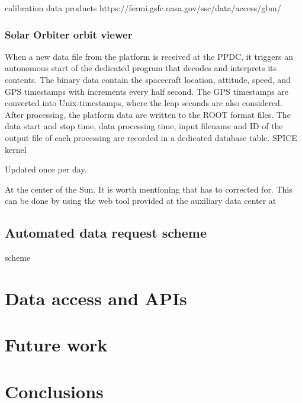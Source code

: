 \documentclass{aa}
\begin{document}
calibration data products
https://fermi.gsfc.nasa.gov/ssc/data/access/gbm/
\subsubsection{Solar Orbiter orbit viewer}


When a new data file from the platform is received at the PPDC,
it triggers an autonomous start of the dedicated program that decodes and
interprets its contents. The binary data contain the spacecraft location, attitude, speed, and GPS timestamps with increments every half second. The GPS timestamps are converted into Unix-timestamps, where the leap seconds are also considered. After processing, the platform data are written to the ROOT format files. The data start and stop time, data processing time, input filename and ID of the output file of each processing are recorded in a dedicated database table.
SPICE kernel

Updated once per day.

At the center of the Sun.
It is worth mentioning that has to corrected for.
This can be done by using the web tool provided at the auxiliary data center at

\subsection{Automated data request scheme}
scheme


\section{Data access and APIs}
\section{Future work}
\section{Conclusions}



%
%



\end{document}
